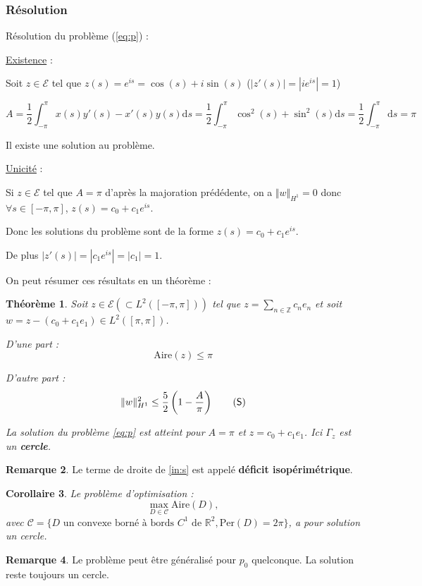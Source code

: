 \documentclass[10pt,a4paper]{article}
\newcommand{\R}{\mathbb{R}}
\newcommand{\Z}{\mathbb{Z}}
\newcommand{\C}{\mathcal{C}}
\renewcommand{\d}{\mathrm{d}}
\newcommand{\A}{\mathrm{Aire}}
\newcommand{\p}{\mathrm{Per}}
\renewcommand{\ss}{\vspace*{\baselineskip}}
\theoremstyle{plain}
\newtheorem{thm}{Théorème}[section]
\newtheorem{coro}[thm]{Corollaire}
\theoremstyle{definition}
\newtheorem{rem}[thm]{Remarque}
\begin{document}
\subsubsection{Résolution}

Résolution du problème (\ref{eq:p}) :

\underline{Existence} :

Soit $z \in \mathcal{E}$ tel que $z(s)=e^{is} = \cos(s)+i\sin(s)$ ($|z'(s)|=|ie^{is}|=1$)

\[ A = \frac{1}{2} \int_{-\pi}^{\pi}{ x(s)y'(s) - x'(s)y(s) \d s } = \frac{1}{2} \int_{-\pi}^{\pi}{ \cos^2(s) + \sin^2(s) \d s } = \frac{1}{2} \int_{-\pi}^{\pi}{ \d s } = \pi \]

Il existe une solution au problème.

\underline{Unicité} :

Si $z \in \mathcal{E}$ tel que $A=\pi$ d'après la majoration prédédente, on a $\Vert w\Vert_{H^1}=0$ donc $\forall s\in [-\pi,\pi]$, $z(s) = c_0+c_1e^{is}$.

Donc les solutions du problème sont de la forme $z(s) = c_0+c_1e^{is}$.

De plus $|z'(s)|=|c_1e^{is}| = |c_1| = 1$.

\ss
On peut résumer ces résultats en un théorème : 
\begin{thm}
Soit $z \in \mathcal{E} (\subset L^2([-\pi,\pi]))$ tel que $z = \sum_{n \in \Z}{c_n e_n}$ et soit $w = z-  \left(c_0 + c_1 e_1\right) \in L^2([\pi,\pi])$.

D'une part :
\[ \A(z) \leq \pi \]

D'autre part :
\[ \Vert w\Vert_{H^1}^2 \leq \frac{5}{2} \left(1 - \frac{A}{\pi}\right) \label{in:s} \tag{\textsf{S}} \]

La solution du problème \ref{eq:p} est atteint pour $A = \pi$ et $z = c_0 + c_1 e_1$. Ici $\Gamma_z$ est un \textbf{cercle}.
\end{thm}

\begin{rem}
Le terme de droite de \ref{in:s} est appelé \textbf{déficit isopérimétrique}.
\end{rem}

\begin{coro}
Le problème d'optimisation :
\[\max_{D \in \C} \A(D), \]
avec $\mathcal{C} = \{ D \text{ un convexe borné à bords $C^1$ de } \R^2, \p(D) = 2\pi \}$, a pour solution un cercle.
\end{coro}

\begin{rem}
Le problème peut être généralisé pour $p_0$ quelconque. La solution reste toujours un cercle.
\end{rem}
\end{document}
